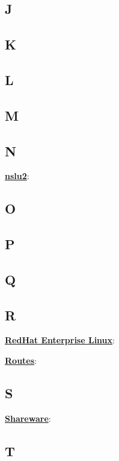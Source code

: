 \subsection{J}

\subsection{K}

\subsection{L}

\subsection{M}

\subsection{N}

\underline{\textbf{nslu2}}: %

\subsection{O}

\subsection{P}

\subsection{Q}

\subsection{R}

\underline{\textbf{RedHat Enterprise Linux}}: %

\underline{\textbf{Routes}}: %



\subsection{S}

\underline{\textbf{Shareware}}: %

\subsection{T}

